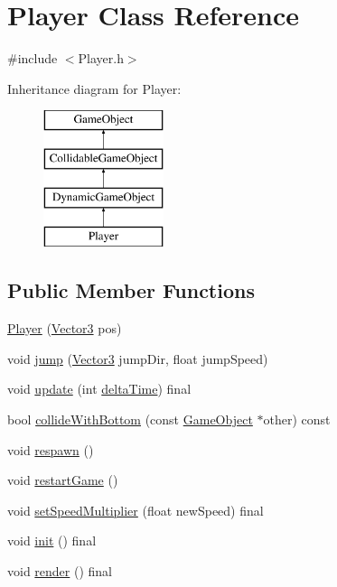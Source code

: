 \hypertarget{class_player}{}\section{Player Class Reference}
\label{class_player}


{\ttfamily \#include $<$Player.\+h$>$}

Inheritance diagram for Player\+:\begin{figure}[H]
\begin{center}
\leavevmode
\includegraphics[height=4.000000cm]{class_player}
\end{center}
\end{figure}
\subsection*{Public Member Functions}
\begin{DoxyCompactItemize}
\item 
\hyperlink{class_player_a764ad06a52c68d38a95f61a731369c86}{Player} (\hyperlink{class_vector3}{Vector3} pos)
\item 
void \hyperlink{class_player_a72cc16348453f3a4b871eb2486c91497}{jump} (\hyperlink{class_vector3}{Vector3} jump\+Dir, float jump\+Speed)
\item 
void \hyperlink{class_player_a51e705a6ad3628144e02832d1839b360}{update} (int \hyperlink{_game_manager_8h_afea6a95c7a1c119b7106a4c735eb259d}{delta\+Time}) final
\item 
bool \hyperlink{class_player_a476948950b48fde97113707c1b6e6195}{collide\+With\+Bottom} (const \hyperlink{class_game_object}{Game\+Object} $\ast$other) const
\item 
void \hyperlink{class_player_a038a74bd768b6eec8fbe57cb2bacf811}{respawn} ()
\item 
void \hyperlink{class_player_a41f9e4a4e55ee3fc38614dcb965193a1}{restart\+Game} ()
\item 
void \hyperlink{class_player_a9098e6b411ea9102b02bb911eca6515b}{set\+Speed\+Multiplier} (float new\+Speed) final
\item 
void \hyperlink{class_player_a1fb512423a77eee4ed0dea7cb7179c83}{init} () final
\item 
void \hyperlink{class_player_a4da76233f59ad0254aa6ec533f9badcc}{render} () final
\end{DoxyCompactItemize}
